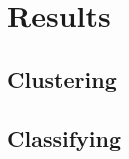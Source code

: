 \chapter{Results}\label{chap:results}
\section{Clustering}\label{sec:clusteringbsresults}
\section{Classifying}
